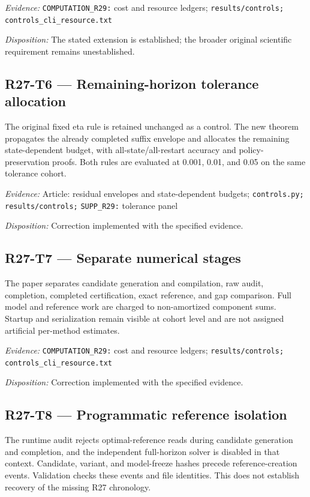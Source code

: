 \emph{Evidence:} \nolinkurl{COMPUTATION_R29:} cost and resource ledgers; \nolinkurl{results/controls;} \nolinkurl{controls_cli_resource.txt}

\emph{Disposition:} The stated extension is established; the broader original scientific requirement remains unestablished.
\subsection{R27-T6 --- Remaining-horizon tolerance allocation}
The original fixed eta rule is retained unchanged as a control. The new theorem propagates the already completed suffix envelope and allocates the remaining state-dependent budget, with all-state/all-restart accuracy and policy-preservation proofs. Both rules are evaluated at 0.001, 0.01, and 0.05 on the same tolerance cohort.

\emph{Evidence:} Article: residual envelopes and state-dependent budgets; \nolinkurl{controls.py;} \nolinkurl{results/controls;} \nolinkurl{SUPP_R29:} tolerance panel

\emph{Disposition:} Correction implemented with the specified evidence.
\subsection{R27-T7 --- Separate numerical stages}
The paper separates candidate generation and compilation, raw audit, completion, completed certification, exact reference, and gap comparison. Full model and reference work are charged to non-amortized component sums. Startup and serialization remain visible at cohort level and are not assigned artificial per-method estimates.

\emph{Evidence:} \nolinkurl{COMPUTATION_R29:} cost and resource ledgers; \nolinkurl{results/controls;} \nolinkurl{controls_cli_resource.txt}

\emph{Disposition:} Correction implemented with the specified evidence.
\subsection{R27-T8 --- Programmatic reference isolation}
The runtime audit rejects optimal-reference reads during candidate generation and completion, and the independent full-horizon solver is disabled in that context. Candidate, variant, and model-freeze hashes precede reference-creation events. Validation checks these events and file identities. This does not establish recovery of the missing R27 chronology.

